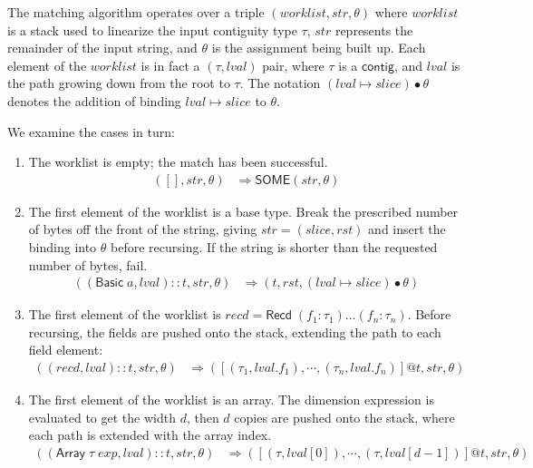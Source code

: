 \documentclass[sigplan,10pt,anonymous,review]{acmart}\settopmatter{printfolios=true,printccs=false,printacmref=false}
\newcommand{\konst}[1]{\ensuremath{\mathsf{#1}}}
\newcommand{\lval}{\ensuremath{\mathit{lval}}}
\begin{document}
\begin{definition}

The matching algorithm operates over a triple $(\mathit{worklist},
\mathit{str}, \theta)$ where $\mathit{worklist}$ is a stack used to
linearize the input contiguity type $\tau$, $\mathit{str}$ represents
the remainder of the input string, and $\theta$ is the assignment
being built up. Each element of the $\mathit{worklist}$ is in fact a
$(\tau,\mathit{lval})$ pair, where $\tau$ is a \konst{contig}, and
$\mathit{lval}$ is the path growing down from the root to $\tau$. The
notation $(\lval \mapsto \mathit{slice}) \bullet \theta$ denotes the
addition of binding $\lval \mapsto \mathit{slice}$ to $\theta$.

We examine the cases in turn:

\begin{enumerate}

\item The worklist is empty; the match has been successful.
%
\begin{align*}
([], \mathit{str}, \theta) &\Rightarrow \konst{SOME}(\mathit{str}, \theta)
\end{align*}


\item The first element of the worklist is a base type. Break the
  prescribed number of bytes off the front of the string, giving
  $\mathit{str} = (\mathit{slice},\mathit{rst})$ and insert the
  binding into $\theta$ before recursing. If the string is shorter
  than the requested number of bytes, fail.
%
\begin{align*}
((\konst{Basic}\;a, \lval)::t, \mathit{str}, \theta)
   &\Rightarrow
  (t,\mathit{rst}, (\lval \mapsto \mathit{slice}) \bullet \theta)
\end{align*}

\item The first element of the worklist is $\mathit{recd} =
  \konst{Recd}\;(f_1 : \tau_1) \ldots (f_n : \tau_n)$. Before
  recursing, the fields are pushed onto the stack, extending the path
  to each field element:
%
\begin{align*}
((\mathit{recd}, \lval)::t, \mathit{str}, \theta)
   &\Rightarrow
  ([(\tau_1,\lval.f_1), \cdots , (\tau_n,\lval.f_n)] @ t,\mathit{str}, \theta)
\end{align*}

\item The first element of the worklist is an array. The dimension
  expression is evaluated to get the width $d$, then $d$ copies are
  pushed onto the stack, where each path is extended with the array
  index.
%
\begin{align*}
((\konst{Array}\; \tau \; \mathit{exp},\lval)::t, \mathit{str}, \theta)
   &\Rightarrow
  ([(\tau,\lval[0]), \cdots , (\tau,\lval[d-1])] @ t,\mathit{str}, \theta)
\end{align*}


\end{enumerate}
\end{definition}
\end{document}
